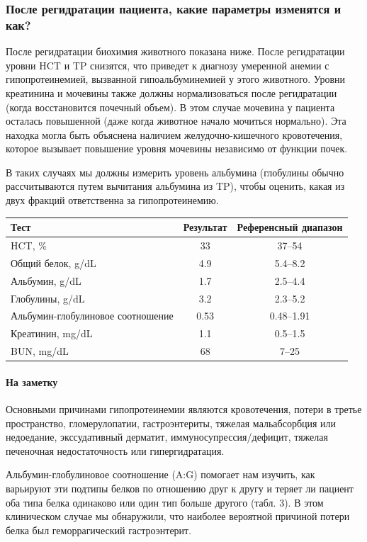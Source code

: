 \documentclass[a4paper,12pt]{book}
\begin{document}
\subsubsection*{После регидратации пациента, какие параметры изменятся и как?}
После регидратации биохимия животного показана ниже. После регидратации уровни HCT и TP снизятся, что приведет к диагнозу умеренной анемии с гипопротеинемией, вызванной гипоальбуминемией у этого животного. Уровни креатинина и мочевины также должны нормализоваться после регидратации (когда восстановится почечный объем). В этом случае мочевина у пациента осталась повышенной (даже когда животное начало мочиться нормально). Эта находка могла быть объяснена наличием желудочно-кишечного кровотечения, которое вызывает повышение уровня мочевины независимо от функции почек.

В таких случаях мы должны измерить уровень альбумина (глобулины обычно рассчитываются путем вычитания альбумина из TP), чтобы оценить, какая из двух фракций ответственна за гипопротеинемию.

\begin{tabular}{lcc}
\toprule
Тест & Результат & Референсный диапазон \\
\midrule
HCT, \% & 33 & 37--54 \\
Общий белок, g/dL & 4.9 & 5.4--8.2 \\
Альбумин, g/dL & 1.7 & 2.5--4.4 \\
Глобулины, g/dL & 3.2 & 2.3--5.2 \\
Альбумин-глобулиновое соотношение & 0.53 & 0.48--1.91 \\
Креатинин, mg/dL & 1.1 & 0.5--1.5 \\
BUN, mg/dL & 68 & 7--25 \\
\bottomrule
\end{tabular}

\paragraph{На заметку}
Основными причинами гипопротеинемии являются кровотечения, потери в третье пространство, гломерулопатии, гастроэнтериты, тяжелая мальабсорбция или недоедание, экссудативный дерматит, иммуносупрессия/дефицит, тяжелая печеночная недостаточность или гипергидратация.

Альбумин-глобулиновое соотношение (A:G) помогает нам изучить, как варьируют эти подтипы белков по отношению друг к другу и теряет ли пациент оба типа белка одинаково или один тип больше другого (табл. 3). В этом клиническом случае мы обнаружили, что наиболее вероятной причиной потери белка был геморрагический гастроэнтерит.
\end{document}
